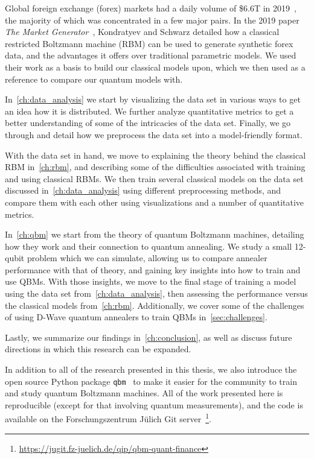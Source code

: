 Global foreign exchange (forex) markets had a daily volume of \$6.6T in 2019~\cite{bis_2019}, the majority of which was concentrated in a few major pairs.
In the 2019 paper \textit{The Market Generator}~\cite{kondratyev_2019}, Kondratyev and Schwarz detailed how a classical restricted Boltzmann machine (RBM) can be used to generate synthetic forex data, and the advantages it offers over traditional parametric models.
We used their work as a basis to build our classical models upon, which we then used as a reference to compare our quantum models with.

In~\cref{ch:data_analysis} we start by visualizing the data set in various ways to get an idea how it is distributed.
We further analyze quantitative metrics to get a better understanding of some of the intricacies of the data set.
Finally, we go through and detail how we preprocess the data set into a model-friendly format.

With the data set in hand, we move to explaining the theory behind the classical RBM in~\cref{ch:rbm}, and describing some of the difficulties associated with training and using classical RBMs.
We then train several classical models on the data set discussed in~\cref{ch:data_analysis} using different preprocessing methods, and compare them with each other using visualizations and a number of quantitative metrics.

In~\cref{ch:qbm} we start from the theory of quantum Boltzmann machines, detailing how they work and their connection to quantum annealing.
We study a small 12-qubit problem which we can simulate, allowing us to compare annealer performance with that of theory, and gaining key insights into how to train and use QBMs.
With those insights, we move to the final stage of training a model using the data set from~\cref{ch:data_analysis}, then assessing the performance versus the classical models from~\cref{ch:rbm}.
Additionally, we cover some of the challenges of using D-Wave quantum annealers to train QBMs in~\cref{sec:challenges}.

Lastly, we summarize our findings in~\cref{ch:conclusion}, as well as discuss future directions in which this research can be expanded.

In addition to all of the research presented in this thesis, we also introduce the open source Python package \texttt{qbm}~\cite{qbm} to make it easier for the community to train and study quantum Boltzmann machines.
All of the work presented here is reproducible (except for that involving quantum measurements), and the code is available on the Forschungszentrum J\"ulich Git server~\footnote{\url{https://jugit.fz-juelich.de/qip/qbm-quant-finance}}.
